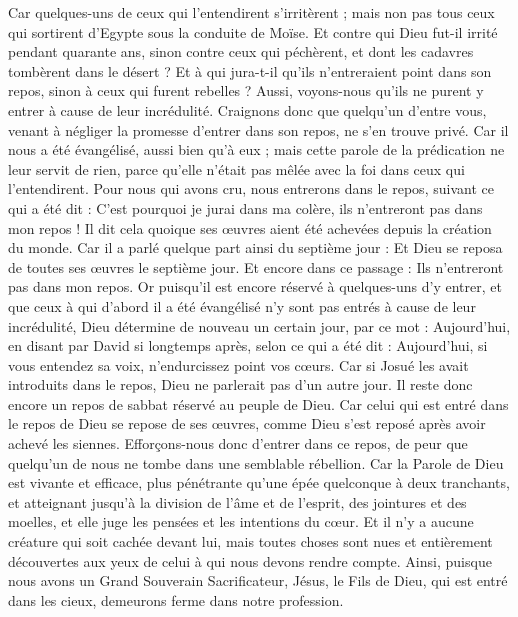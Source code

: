 \begin{multicols}{2}
Car quelques-uns de ceux qui l’entendirent s’irritèrent ; mais non pas tous ceux qui sortirent d’Egypte sous la conduite de Moïse.
Et contre qui Dieu fut-il irrité pendant quarante ans, sinon contre ceux qui péchèrent, et dont les cadavres tombèrent dans le désert ?
Et à qui jura-t-il qu'ils n'entreraient point dans son repos, sinon à ceux qui furent rebelles ?
Aussi, voyons-nous qu'ils ne purent y entrer à cause de leur incrédulité.
\TextTitle{[Le repos]}
\VerseOne{}Craignons donc que quelqu'un d'entre vous, venant à négliger la promesse d'entrer dans son repos, ne s'en trouve privé.
Car il nous a été évangélisé, aussi bien qu’à eux ; mais cette parole de la prédication ne leur servit de rien, parce qu'elle n'était pas mêlée avec la foi dans ceux qui l’entendirent.
Pour nous qui avons cru, nous entrerons dans le repos, suivant ce qui a été dit : C'est pourquoi je jurai dans ma colère, ils n’entreront pas dans mon repos ! Il dit cela quoique ses œuvres aient été achevées depuis la création du monde.
Car il a parlé quelque part ainsi du septième jour : Et Dieu se reposa de toutes ses œuvres le septième jour.
Et encore dans ce passage : Ils n’entreront pas dans mon repos.
Or puisqu’il est encore réservé à quelques-uns d’y entrer, et que ceux à qui d’abord il a été évangélisé n’y sont pas entrés à cause de leur incrédulité,
Dieu détermine de nouveau un certain jour, par ce mot : Aujourd'hui, en disant par David si longtemps après, selon ce qui a été dit : Aujourd'hui, si vous entendez sa voix, n'endurcissez point vos cœurs.
Car si Josué les avait introduits dans le repos, Dieu ne parlerait pas d'un autre jour.
Il reste donc encore un repos de sabbat réservé au peuple de Dieu.
Car celui qui est entré dans le repos de Dieu se repose de ses œuvres, comme Dieu s’est reposé après avoir achevé les siennes.
Efforçons-nous donc d'entrer dans ce repos, de peur que quelqu'un de nous ne tombe dans une semblable rébellion.
Car la Parole de Dieu est vivante et efficace, plus pénétrante qu’une épée quelconque à deux tranchants, et atteignant jusqu’à la division de l'âme et de l'esprit, des jointures et des moelles, et elle juge les pensées et les intentions du cœur.
Et il n'y a aucune créature qui soit cachée devant lui, mais toutes choses sont nues et entièrement découvertes aux yeux de celui à qui nous devons rendre compte.
Ainsi, puisque nous avons un Grand Souverain Sacrificateur, Jésus, le Fils de Dieu, qui est entré dans les cieux, demeurons ferme dans notre profession.

\end{multicols}
